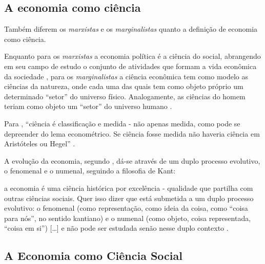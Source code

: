 \documentclass[
	12pt,				%
	oneside,			%
	a4paper,			%
	chapter=TITLE,		%
	section=TITLE,		%
	english,			%
	brazil				%
	]{abntex2}
\begin{document}
\subsection{A economia como ciência}\label{a-economia-como-ciuxeancia}

Também diferem os \emph{marxistas} e os \emph{marginalistas} quanto a
definição de economia como ciência.

Enquanto para os \emph{marxistas} a economia política é a ciência do
social, abrangendo em seu campo de estudo o conjunto de atividades que
formam a vida econômica da sociedade \autocite[14]{singer}, para os
\emph{marginalistas} a ciência econômica tem como modelo as ciências da
natureza, onde cada uma das quais tem como objeto próprio um determinado
``setor'' do universo físico. Analogamente, as ciências do homem teriam
como objeto um ``setor'' do universo humano \autocite[15]{singer}.

Para \textcite{rangel1956}, ``ciência é classificação e medida - não
apenas medida, como pode se depreender do lema econométrico. Se ciência
fosse medida não haveria ciência em Aristóteles ou Hegel''
\autocite[204]{rangel1956}.

A evolução da economia, segundo \textcite{rangel1956}, dá-se através de
um duplo processo evolutivo, o fenomenal e o numenal, seguindo a
filosofia de Kant:
\begin{citacao}
a economia é uma ciência histórica por excelência - qualidade que partilha com
outras ciências sociais. Quer isso dizer que está submetida a um duplo processo
evolutivo: o fenomenal (como representação, como ideia da coisa, como ``coisa
para nós'', no sentido kantiano) e o numenal (como objeto, coisa representada,
``coisa em si'') [\ldots] e não pode ser estudada senão nesse duplo contexto
\cite[p.~204]{rangel1956}.
\end{citacao}
\subsection{A Economia como Ciência
Social}\label{a-economia-como-ciuxeancia-social}
\end{document}
